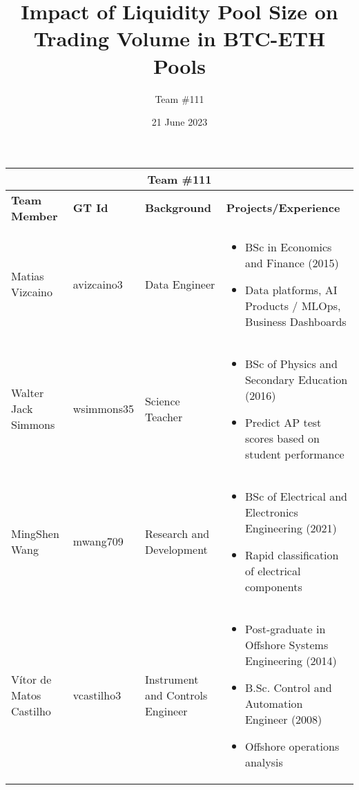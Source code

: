 \documentclass{article}
\makeatletter
\renewcommand{\maketitle}{\bgroup\setlength{\parindent}{0pt}
\begin{center} %
  \Large\@title
\end{center}
\begin{flushright}
  \@date
\end{flushright}
\egroup}
\makeatother
\begin{document}
\title{Impact of Liquidity Pool Size on Trading Volume in BTC-ETH Pools}
\author{Team \#111}
\date{21 June 2023}
\maketitle

\noindent
{\setlength{\tabcolsep}{4pt} %

\begin{table}[htbp]
  \centering
  \fontsize{9}{10}\selectfont %
  \setlength{\tabcolsep}{3pt} %
  \renewcommand{\arraystretch}{0.8} %

  \begin{tabularx}{\textwidth}{@{}p{2.5cm}p{2cm}p{3cm}>{\raggedright\arraybackslash}X@{}}
    \toprule
    \multicolumn{4}{c}{\textbf{Team \#111}} \\ \midrule
    \textbf{Team Member} & \textbf{GT Id} & \textbf{Background} & \textbf{Projects/Experience} \\ \midrule
    \raggedright Matias Vizcaino & \raggedright avizcaino3 & \raggedright Data Engineer & \begin{itemize}[nosep, leftmargin=*]
      \item BSc in Economics and Finance (2015)
      \item Data platforms, AI Products / MLOps, Business Dashboards
    \end{itemize} \\
    \raggedright Walter Jack Simmons & \raggedright wsimmons35 & \raggedright Science Teacher & \begin{itemize}[nosep, leftmargin=*]
      \item BSc of Physics and Secondary Education (2016)
      \item Predict AP test scores based on student performance
    \end{itemize} \\
    \raggedright MingShen Wang & \raggedright mwang709 & \raggedright Research and Development & \begin{itemize}[nosep, leftmargin=*]
      \item BSc of Electrical and Electronics Engineering (2021)
      \item Rapid classification of electrical components
    \end{itemize} \\
    \raggedright Vítor de Matos Castilho & \raggedright vcastilho3 & \raggedright Instrument and Controls Engineer & \begin{itemize}[nosep, leftmargin=*]
      \item Post-graduate in Offshore Systems Engineering (2014)
      \item B.Sc. Control and Automation Engineer (2008)
      \item Offshore operations analysis
    \end{itemize} \\ \bottomrule
  \end{tabularx}
\end{table}

}
\end{document}
